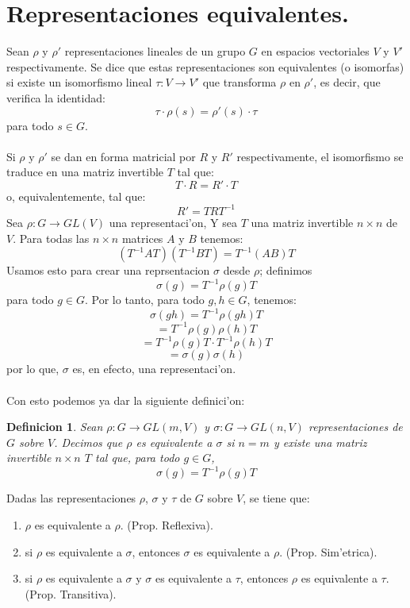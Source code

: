 \documentclass[a4paper,openright,12pt]{report}
\numberwithin{equation}{section} %
\newtheorem{definicion}{Definicion}[section] %
\begin{document}
\section{Representaciones equivalentes.}
Sean $\rho$ y $\rho'$ representaciones lineales de un grupo $G$ en espacios vectoriales $V$ y $V'$ respectivamente. Se dice que estas representaciones son equivalentes (o isomorfas) si existe un isomorfismo lineal $\tau : V \rightarrow V'$ que transforma $\rho$ en $\rho'$, es decir, que verifica la identidad:
\[
\tau \cdot \rho (s) = \rho' (s) \cdot \tau
\]
para todo $s \in G$.\\
\\
Si $\rho$ y $\rho'$ se dan en forma matricial por $R$ y $R'$ respectivamente, el isomorfismo se traduce en una matriz invertible $T$ tal que:
\[
T \cdot R = R' \cdot T
\]
o, equivalentemente, tal que:
\[
R' = TRT^{-1}
\] 
Sea $\rho : G \rightarrow GL(V)$ una representaci'on, Y sea $T$ una matriz invertible $n \times n$ de $V$. Para todas las $n \times n$ matrices $A$ y $B$ tenemos:
\[
(T^{-1}AT)(T^{-1}BT)=T^{-1}(AB)T
\]
Usamos esto para crear una reprsentacion $\sigma$ desde $\rho$; definimos
\[
\sigma (g) = T^{-1}\rho (g) T
\]
para todo $g \in G$. Por lo tanto, para todo $g,h \in G$, tenemos:
\[
\sigma (gh) = T^{-1} \rho (gh) T
\]
\[
= T^{-1}\rho (g) \rho (h) T
\]
\[
=T^{-1}\rho (g)T \cdot T^{-1}\rho (h)T 
\]
\[
=\sigma (g) \sigma (h)
\]
por lo que, $\sigma$ es, en efecto, una representaci'on.\\
\\
Con esto podemos ya dar la siguiente definici'on:
\begin{definicion}
Sean $\rho : G \rightarrow GL(m,V)$ y $\sigma : G \rightarrow GL(n,V)$ representaciones de $G$ sobre $V$. Decimos que $\rho$ es equivalente a $\sigma$ si $n=m$ y existe una matriz invertible $n \times n$ $T$ tal que, para todo $g \in G$,
\[
\sigma (g) = T^{-1} \rho (g) T
\]
\end{definicion}
Dadas las representaciones $\rho$, $\sigma$ y $\tau$ de $G$ sobre $V$, se tiene que:
\begin{enumerate}
\item $\rho$ es equivalente a $\rho$. (Prop. Reflexiva).
\item si $\rho$ es equivalente a $\sigma$, entonces $\sigma$ es equivalente a $\rho$. (Prop. Sim'etrica).
\item si $\rho$ es equivalente a $\sigma$ y $\sigma$ es equivalente a $\tau$, entonces $\rho$ es equivalente a $\tau$. (Prop. Transitiva).
\end{enumerate}
\end{document}
